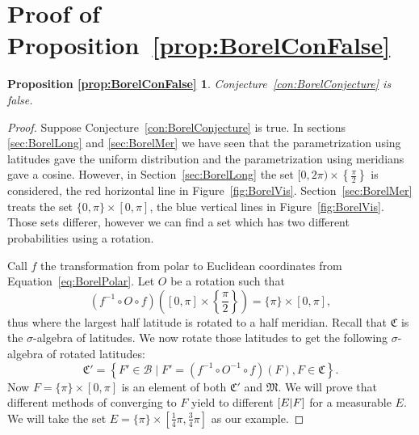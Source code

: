 \documentclass[a4paper]{report}
\theoremstyle{plain}
\newtheorem*{propositionBorelConFalse}{Proposition \ref{prop:BorelConFalse}}
\theoremstyle{definition}
\theoremstyle{remark}
\numberwithin{equation}{chapter}
\let\P\relax
\DeclareMathOperator{\P}{\mathbb{P}}
\DeclareMathOperator{\1}{\mathbbm{1}}
\newcommand{\B}{\mathcal{B}}
\begin{document}
\section{Proof of Proposition~\ref{prop:BorelConFalse}}\label{app:ProofBorelConFalse}
\begin{propositionBorelConFalse}
Conjecture~\ref{con:BorelConjecture} is false.
\end{propositionBorelConFalse}
\begin{proof}

Suppose Conjecture~\ref{con:BorelConjecture} is true. In sections \ref{sec:BorelLong} and \ref{sec:BorelMer} we have seen that the parametrization using latitudes gave the uniform distribution and the parametrization using meridians gave a cosine. However, in Section~\ref{sec:BorelLong} the set $[0,2\pi)\times\left\{\frac{\pi}{2}\right\}$ is considered, the red horizontal line in Figure~\ref{fig:BorelVis}. Section~\ref{sec:BorelMer} treats the set $\{0,\pi\}\times[0,\pi]$, the blue vertical lines in Figure~\ref{fig:BorelVis}. Those sets differer, however we can find a set which has two different probabilities using a rotation.

Call $f$ the transformation from polar to Euclidean coordinates from Equation~\ref{eq:BorelPolar}. Let $O$ be a rotation such that
\begin{equation}
(f^{-1}\circ O\circ f)\left([0,\pi]\times\left\{\frac{\pi}{2}\right\}\right)=\{\pi\}\times[0,\pi],
\end{equation}
thus where the largest half latitude is rotated to a half meridian. Recall that $\mathfrak{C}$ is the $\sigma$-algebra of latitudes. We now rotate those latitudes to get the following $\sigma$-algebra of rotated latitudes:
\begin{equation}
\mathfrak{C}'=\left\{F'\in\B\mid F'=\left(f^{-1}\circ O^{-1}\circ f\right)(F),F\in\mathfrak{C}\right\}.
\end{equation}
Now $F=\{\pi\}\times[0,\pi]$ is an element of both $\mathfrak{C}'$ and $\mathfrak{M}$. We will prove that different methods of converging to $F$ yield to different $\P[E|F]$ for a measurable $E$. We will take the set $E=\{\pi\}\times\left[\frac{1}{4}\pi,\frac{3}{4}\pi\right]$ as our example.


\end{proof}
\end{document}
